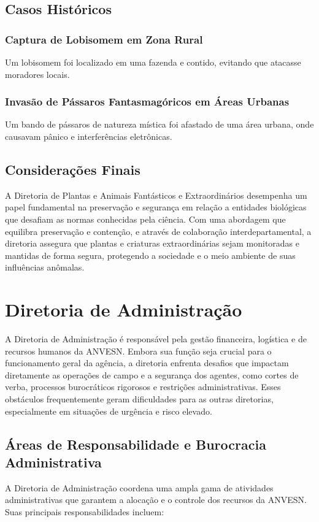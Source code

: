 \section{Casos Históricos}

\subsection{Captura de Lobisomem em Zona Rural} Um lobisomem foi localizado em uma fazenda e contido, evitando que atacasse moradores locais.

\subsection{Invasão de Pássaros Fantasmagóricos em Áreas Urbanas} Um bando de pássaros de natureza mística foi afastado de uma área urbana, onde causavam pânico e interferências eletrônicas.

\section{Considerações Finais}

A Diretoria de Plantas e Animais Fantásticos e Extraordinários desempenha um papel fundamental na preservação e segurança em relação a entidades biológicas que desafiam as normas conhecidas pela ciência. Com uma abordagem que equilibra preservação e contenção, e através de colaboração interdepartamental, a diretoria assegura que plantas e criaturas extraordinárias sejam monitoradas e mantidas de forma segura, protegendo a sociedade e o meio ambiente de suas influências anômalas.


\chapter{Diretoria de Administração}

A Diretoria de Administração é responsável pela gestão financeira, logística e de recursos humanos da ANVESN. Embora sua função seja crucial para o funcionamento geral da agência, a diretoria enfrenta desafios que impactam diretamente as operações de campo e a segurança dos agentes, como cortes de verba, processos burocráticos rigorosos e restrições administrativas. Esses obstáculos frequentemente geram dificuldades para as outras diretorias, especialmente em situações de urgência e risco elevado.

\section{Áreas de Responsabilidade e Burocracia Administrativa}
A Diretoria de Administração coordena uma ampla gama de atividades administrativas que garantem a alocação e o controle dos recursos da ANVESN. Suas principais responsabilidades incluem:

